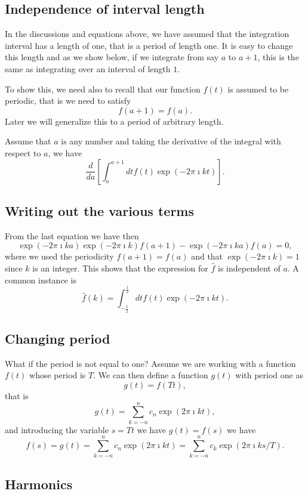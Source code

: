 \documentclass[%
oneside,                 %
final,                   %
10pt]{article}
\begin{document}
\subsection{Independence of interval length}

In the discussions and equations above, we have assumed that the
integration interval has a length of one, that is a period of length one. It is easy to change this
length and as we show below, if we integrate from say $a$ to $a+1$, this is the same as integrating over an interval of length $1$.

To show this, we need also to recall that our function $f(t)$ is assumed to be periodic, that is we need to satisfy
\[
f(a+1)=f(a).
\]
Later we will generalize this to a period of arbitrary length.

Assume that $a$ is any number and taking the derivative of the integral with respect to $a$, we have
\[
\frac{d}{da}\left[\int_a^{a+1} dt f(t)\exp{(-2\pi\imath kt)}\right]. 
\]

\subsection{Writing out the various terms}

From the last equation we have then
\[
\exp{(-2\pi\imath ka)}\exp{(-2\pi\imath k)}f(a+1)-\exp{(-2\pi\imath ka)}f(a)=0,
\]
where we used the periodicity  $f(a+1)=f(a)$ and that $\exp{(-2\pi\imath k)}=1$ since $k$ is an integer.
This shows that the expression for $\hat{f}$ is independent of $a$. A common instance is
\[
\hat{f}(k)=\int_{-\frac{1}{2}}^{\frac{1}{2}} dt f(t)\exp{(-2\pi\imath kt)}.
\]

\subsection{Changing period}

What if the period is not equal to one? Assume we are working with a
function $f(t)$ whose period is $T$. We can then define a function
$g(t)$ with period one as
\[
g(t) = f(Tt),
\]
that is 
\[
g(t) =\sum_{k=-n}^{n}c_{n}\exp{(2\pi\imath kt)}, 
\]
and introducing the variable $s=Tt$ we have $g(t)=f(s)$ we have
\[
f(s) = g(t)=\sum_{k=-n}^{n}c_{n}\exp{(2\pi\imath kt)}=\sum_{k=-n}^{n}c_{k}\exp{(2\pi\imath ks/T)}. 
\]

\subsection{Harmonics}
\end{document}
